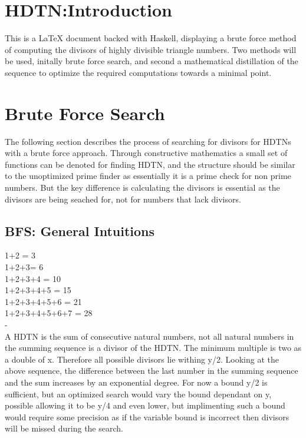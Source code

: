 \documentclass{article}
\begin{document}
\maketitle
\newpage
\section{HDTN:Introduction}
This is a LaTeX document backed with Haskell, displaying a brute
force method of computing the divisors of highly divisible triangle
numbers. Two methods will be used, initally brute force search,
and second a mathematical distillation of the sequence to optimize
the required computations towards a minimal point.
\section{Brute Force Search}
The following section describes the process of searching for divisors for HDTNs with a brute force approach. 
Through constructive mathematics a small set of functions can be denoted for finding HDTN, and the structure
should be similar to the unoptimized prime finder as essentially it is a prime check for non prime numbers.
But the key difference is calculating the divisors is essential as the divisors are being seached for,
not for numbers that lack divisors.
\subsection{BFS: General Intuitions}
1+2 = 3\\
1+2+3= 6\\
1+2+3+4 = 10\\
1+2+3+4+5 = 15\\
1+2+3+4+5+6 = 21\\
1+2+3+4+5+6+7 = 28\\
{\color{white}-}\\
A HDTN is the sum of consecutive natural numbers, not all natural numbers in the summing sequence is a
divisor of the HDTN. The minimum multiple is two as a double of x. Therefore all possible divisors lie
withing y/2. Looking at the above sequence, the difference between the last number in the summing sequence
and the sum increases by an exponential degree. For now a bound y/2 is sufficient, but an optimized search
would vary the bound dependant on y, possible allowing it to be y/4 and even lower, but implimenting such a
bound would require some precision as if the variable bound is incorrect then divisors will be missed during
the search.
\end{document}
